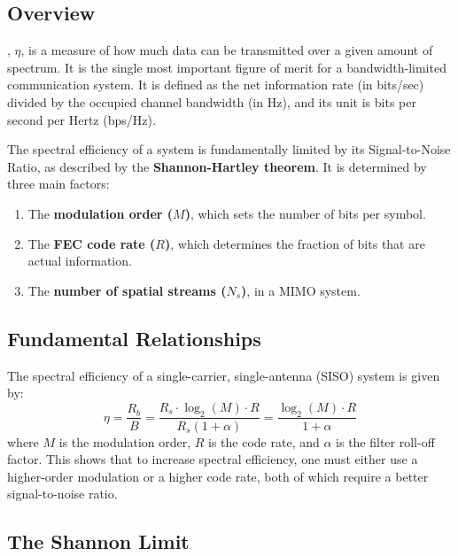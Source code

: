 \subsection{Overview}

, $\eta$, is a measure of how much data can be transmitted over a given amount of spectrum. It is the single most important figure of merit for a bandwidth-limited communication system. It is defined as the net information rate (in bits/sec) divided by the occupied channel bandwidth (in Hz), and its unit is bits per second per Hertz (bps/Hz).

\begin{keyconcept}
    The spectral efficiency of a system is fundamentally limited by its Signal-to-Noise Ratio, as described by the \textbf{Shannon-Hartley theorem}. It is determined by three main factors:
    \begin{enumerate}
        \item The \textbf{modulation order ($M$)}, which sets the number of bits per symbol.
        \item The \textbf{FEC code rate ($R$)}, which determines the fraction of bits that are actual information.
        \item The \textbf{number of spatial streams ($N_s$)}, in a MIMO system.
    \end{enumerate}
\end{keyconcept}


\subsection{Fundamental Relationships}

The spectral efficiency of a single-carrier, single-antenna (SISO) system is given by:
\begin{equation}
    \eta = \frac{R_b}{B} = \frac{R_s \cdot \log_2(M) \cdot R}{R_s(1+\alpha)} = \frac{\log_2(M) \cdot R}{1+\alpha}
\end{equation}
where $M$ is the modulation order, $R$ is the code rate, and $\alpha$ is the filter roll-off factor. This shows that to increase spectral efficiency, one must either use a higher-order modulation or a higher code rate, both of which require a better signal-to-noise ratio.


\subsection{The Shannon Limit}


